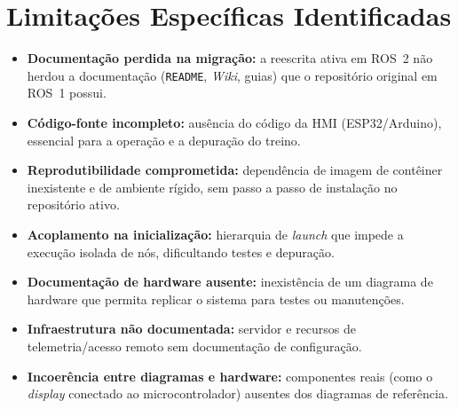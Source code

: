 \section{Limitações Específicas Identificadas}
\label{sec:trike-limitacoes}

\begin{itemize}
	\item \textbf{Documentação perdida na migração:} a reescrita ativa em ROS~2 não herdou a
	      documentação (\texttt{README}, \emph{Wiki}, guias) que o repositório original em
	      ROS~1 possui.
	\item \textbf{Código-fonte incompleto:} ausência do código da HMI (ESP32/Arduino),
	      essencial para a operação e a depuração do treino.
	\item \textbf{Reprodutibilidade comprometida:} dependência de imagem de contêiner
	      inexistente e de ambiente rígido, sem passo a passo de instalação no repositório
	      ativo.
	\item \textbf{Acoplamento na inicialização:} hierarquia de \emph{launch} que impede a
	      execução isolada de nós, dificultando testes e depuração.
	\item \textbf{Documentação de hardware ausente:} inexistência de um diagrama de hardware
	      que permita replicar o sistema para testes ou manutenções.
	\item \textbf{Infraestrutura não documentada:} servidor e recursos de telemetria/acesso
	      remoto sem documentação de configuração.
	\item \textbf{Incoerência entre diagramas e hardware:} componentes reais (como o
	      \emph{display} conectado ao microcontrolador) ausentes dos diagramas de referência.
\end{itemize}
